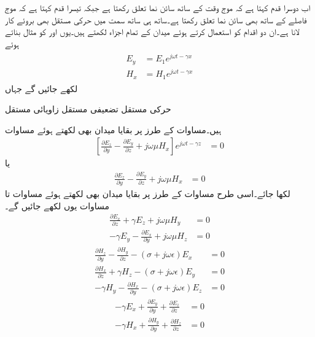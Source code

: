 اب دوسرا قدم کہتا ہے کہ موج وقت کے ساتھ سائن نما تعلق رکھتا ہے جبکہ تیسرا قدم کہتا ہے کہ موج  فاصلے کے ساتھ بھی سائن نما تعلق رکھتا ہے۔ساتھ ہی ساتھ  سمت میں حرکی مستقل بھی بروئے کار لانا ہے۔ان دو اقدام کو استعمال کرتے ہوئے میدان کے تمام اجزاء لکھتے ہیں۔یوں  اور  کو مثال بناتے ہوئے
\begin{gather}
\begin{aligned}\label{مساوات_مویج_سائن_نما_کی_قید}
E_y&=E_1 e^{j \omega t -\gamma x} \\
H_x&=H_1 e^{j \omega t -\gamma x}
\end{aligned}
\end{gather}
لکھے جائیں گے جہاں
\begin{description}
 حرکی مستقل 
 تضعیفی مستقل
 زاویائی مستقل
\end{description}
ہیں۔مساوات  کے طرز پر بقایا میدان بھی لکھتے ہوئے مساوات 
\begin{align*}
\left[\frac{\partial E_z}{\partial y}-\frac{\partial E_y}{\partial z}+j \omega \mu H_x\right] e^{j \omega t -\gamma z}&=0  
\end{align*}
یا
\begin{align}
\frac{\partial E_z}{\partial y}-\frac{\partial E_y}{\partial z}+j \omega \mu H_x&=0  
\end{align}
لکھا جائے۔اسی طرح مساوات  کے طرز پر بقایا میدان بھی لکھتے ہوئے مساوات   تا مساوات  یوں لکھے جائیں گے۔
\begin{align}
\frac{\partial E_x}{\partial z}+\gamma E_z+j \omega \mu H_y&=0  \\
-\gamma E_y-\frac{\partial E_x}{\partial y}+j \omega \mu H_z&=0
\end{align}
%
\begin{align}
\frac{\partial H_z}{\partial y}-\frac{\partial H_y}{\partial z}-(\sigma+j \omega \epsilon)E_x&=0 \\
\frac{\partial H_x}{\partial z}+\gamma H_z-(\sigma+j \omega \epsilon)E_y&=0  \\
-\gamma H_y-\frac{\partial H_x}{\partial y}-(\sigma+j \omega \epsilon)E_z&=0 
\end{align}
%
\begin{align}
-\gamma E_x+\frac{\partial E_y}{\partial y}+\frac{\partial E_z}{\partial z}&=0 \\
-\gamma H_x+\frac{\partial H_y}{\partial y}+\frac{\partial H_z}{\partial z}&=0
\end{align}
